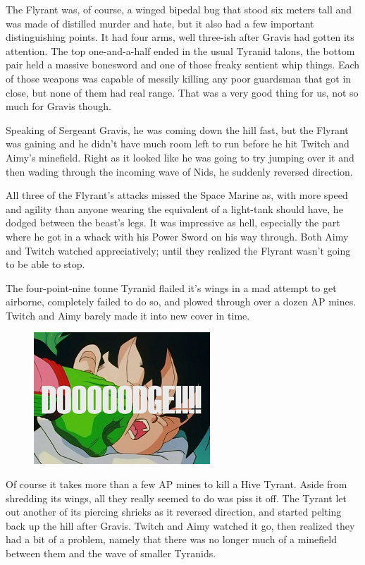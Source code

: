 The Flyrant was, of course, a winged bipedal bug that stood six meters tall and was made of distilled murder and hate, but it also had a few important distinguishing points. 
It had four arms, well three-ish after Gravis had gotten its attention. 
The top one-and-a-half ended in the usual Tyranid talons, the bottom pair held a massive bonesword and one of those freaky sentient whip things. 
Each of those weapons was capable of messily killing any poor guardsman that got in close, but none of them had real range. 
That was a very good thing for us, not so much for Gravis though.

Speaking of Sergeant Gravis, he was coming down the hill fast, but the Flyrant was gaining and he didn't have much room left to run before he hit Twitch and Aimy's minefield. 
Right as it looked like he was going to try jumping over it and then wading through the incoming wave of Nids, he suddenly reversed direction. 


All three of the Flyrant's attacks missed the Space Marine as, with more speed and agility than anyone wearing the equivalent of a light-tank should have, he dodged between the beast's legs. 
It was impressive as hell, especially the part where he got in a whack with his Power Sword on his way through. 
Both Aimy and Twitch watched appreciatively; 
until they realized the Flyrant wasn't going to be able to stop.

The four-point-nine tonne Tyranid flailed it's wings in a mad attempt to get airborne, completely failed to do so, and plowed through over a dozen AP mines. 
Twitch and Aimy barely made it into new cover in time.
\begin{figure}
	\begin{center}
		\includegraphics[width=\figwidth]{pics/12/49.png}
	\end{center}
\end{figure}
Of course it takes more than a few AP mines to kill a Hive Tyrant. 
Aside from shredding its wings, all they really seemed to do was piss it off. 
The Tyrant let out another of its piercing shrieks as it reversed direction, and started pelting back up the hill after Gravis. 
Twitch and Aimy watched it go, then realized they had a bit of a problem, namely that there was no longer much of a minefield between them and the wave of smaller Tyranids.

